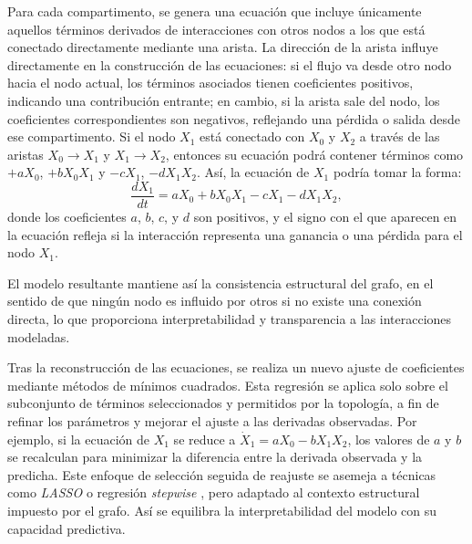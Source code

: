 Para cada compartimento, se genera una ecuación que incluye únicamente aquellos términos derivados de interacciones con otros nodos a los que está conectado 
directamente mediante una arista. La dirección de la arista influye directamente en la construcción de las ecuaciones: si el flujo va desde otro nodo hacia el 
nodo actual, los términos asociados tienen coeficientes positivos, indicando una contribución entrante; en cambio, si la arista sale del nodo, los coeficientes 
correspondientes son negativos, reflejando una pérdida o salida desde ese compartimento. Si el nodo \(X_1\) está conectado con \(X_0\) y \(X_2\) a través de las 
aristas \(X_0 \rightarrow X_1\) y \(X_1 \rightarrow X_2\), entonces su ecuación podrá contener términos como \(+a X_0\), \(+b X_0 X_1\) y \(-c X_1\), \(-d X_1 X_2\). 
Así, la ecuación de \(X_1\) podría tomar la forma:
\[
\frac{dX_1}{dt} = a X_0 + b X_0 X_1 - c X_1 - d X_1 X_2,
\]
donde los coeficientes \(a\), \(b\), \(c\), y \(d\) son positivos, y el signo con el que aparecen en la ecuación refleja si la interacción representa una ganancia 
o una pérdida para el nodo \(X_1\).

El modelo resultante mantiene así la consistencia estructural del grafo, en el sentido de que ningún nodo es influido por otros si no existe una conexión directa, 
lo que proporciona interpretabilidad y transparencia a las interacciones modeladas.

Tras la reconstrucci\'on de las ecuaciones, se realiza un nuevo ajuste de coeficientes mediante m\'etodos de m\'inimos cuadrados. Esta regresi\'on se aplica solo 
sobre el subconjunto de t\'erminos seleccionados y permitidos por la topolog\'ia, a fin de refinar los par\'ametros y mejorar el ajuste a las derivadas observadas.
Por ejemplo, si la ecuaci\'on de $X_1$ se reduce a $\dot{X}_1 = aX_0 - bX_1X_2$, los valores de $a$ y $b$ se recalculan para minimizar la diferencia entre la 
derivada observada y la predicha. Este enfoque de selecci\'on seguida de reajuste se asemeja a t\'ecnicas como \textit{LASSO} \cite{Tibshirani1996} o regresi\'on 
\textit{stepwise} \cite{Efroymson1960}, pero adaptado al contexto estructural impuesto por el grafo. As\'i se equilibra la interpretabilidad del modelo con su capacidad 
predictiva.

